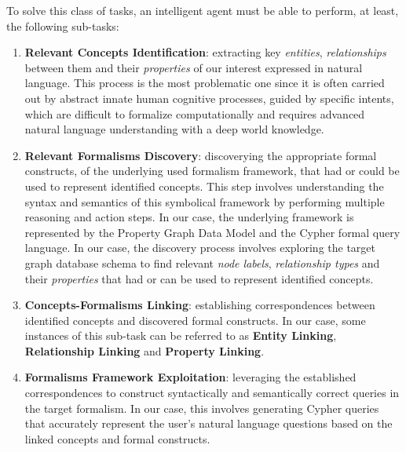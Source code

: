 To solve this class of tasks, an intelligent agent must be able to perform, at least, the following sub-tasks:
\begin{enumerate}
    \item \label{itm:identify} \textbf{Relevant Concepts Identification}: extracting key \textit{entities}, \textit{relationships} between them and their \textit{properties} of our interest expressed in natural language. This process is the most problematic one since it is often carried out by abstract innate human cognitive processes, guided by specific intents, which are difficult to formalize computationally and requires advanced natural language understanding with a deep world knowledge.

    \item \label{itm:discovery} \textbf{Relevant Formalisms Discovery}: discoverying the appropriate formal constructs, of the underlying used formalism framework, that had or could be used to represent identified concepts. This step involves understanding the syntax and semantics of this symbolical framework by performing multiple reasoning and action steps. In our case, the underlying framework is represented by the Property Graph Data Model and the Cypher formal query language. In our case, the discovery process involves exploring the target graph database schema to find relevant \textit{node labels}, \textit{relationship types} and their \textit{properties} that had or can be used to represent identified concepts.

    \item \label{itm:linking} \textbf{Concepts-Formalisms Linking}: establishing correspondences between identified concepts and discovered formal constructs. In our case, some instances of this sub-task can be referred to as \textbf{Entity Linking}, \textbf{Relationship Linking} and \textbf{Property Linking}.
    
    \item \label{itm:representing} \textbf{Formalisms Framework Exploitation}: leveraging the established correspondences to construct syntactically and semantically correct queries in the target formalism. In our case, this involves generating Cypher queries that accurately represent the user's natural language questions based on the linked concepts and formal constructs.
\end{enumerate}%
